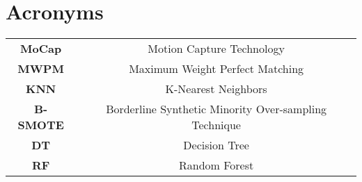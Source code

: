 \section*{\Huge Acronyms}



\begin{table}[H]
    \begin{tabular}{c c}
        \textbf{MoCap} & Motion Capture Technology \\
        \textbf{MWPM} & Maximum Weight Perfect Matching \\
        \textbf{KNN} & K-Nearest Neighbors \\
        \textbf{B-SMOTE} & Borderline Synthetic Minority Over-sampling Technique \\
        \textbf{DT} & Decision Tree \\
        \textbf{RF} & Random Forest \\
    \end{tabular}
\end{table}